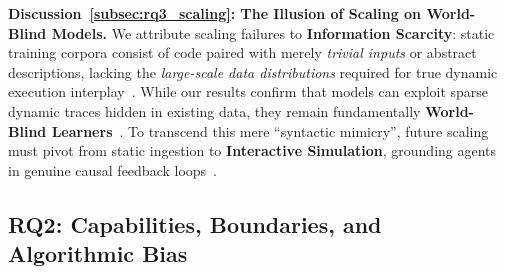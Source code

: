 





\begin{insightbox}
    \textbf{{\textcolor{red}{}} Discussion~\ref{subsec:rq3_scaling}: The Illusion of Scaling on World-Blind Models.}
    We attribute scaling failures to \textbf{Information Scarcity}: static training corpora consist of code paired with merely \textit{trivial inputs} or abstract descriptions, lacking the \textit{large-scale data distributions} required for true dynamic execution interplay~\cite{liu2022mindseyegroundedlanguage}.
    While our results confirm that models can exploit sparse dynamic traces hidden in existing data, they remain fundamentally \textbf{World-Blind Learners}~\cite{floridi2025categoricalanalysislargelanguage}.
    To transcend this mere ``syntactic mimicry'', future scaling must pivot from static ingestion to \textbf{Interactive Simulation}, grounding agents in genuine causal feedback loops~\cite{benderkoller2020climbingtowardsnlu}.
\end{insightbox}

 

\subsection{RQ2: Capabilities, Boundaries, and Algorithmic Bias}
\label{subsec:rq2_boundary}

